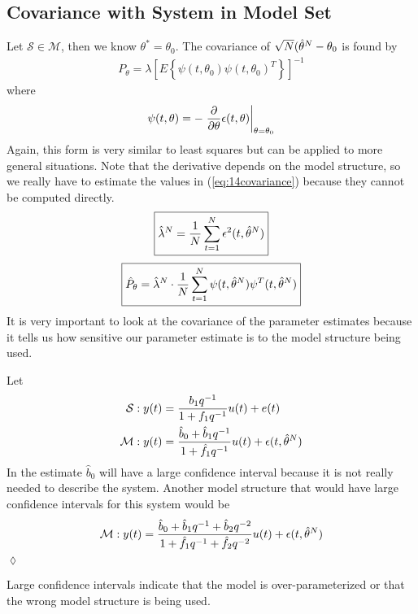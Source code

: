 \subsection{Covariance with System in Model Set}
Let $\mathcal{S}\in\mathcal{M}$, then we know $\theta^\ast=\theta_0$. The covariance of $\sqrt{N}(\hat{\theta}^N-\theta_0$ is found by
\begin{align}
\label{eq:14covariance}
\boxed{P_\theta = \lambda\left[E\left\lbrace \psi(t,\theta_0)\psi(t,\theta_0)^T\right\rbrace\right]^{-1}}
\end{align}
where
$$\psi(t,\theta) = -\left.\frac{\partial}{\partial\theta}\epsilon(t,\theta)\right|_{\theta=\theta_0}$$
Again, this form is very similar to least squares but can be applied to more general situations. Note that the derivative depends on the model structure, so we really have to estimate the values in (\ref{eq:14covariance}) because they cannot be computed directly.
\begin{align*}
\boxed{\hat{\lambda}^N = \frac{1}{N}\sum_{t=1}^N\epsilon^2(t,\hat{\theta}^N)}
\end{align*}
\begin{align*}
\boxed{\hat{P}_\theta = \hat{\lambda}^N\cdot\frac{1}{N}\sum_{t=1}^N\psi(t,\hat{\theta}^N)\psi^T(t,\hat{\theta}^N)}
\end{align*}
It is very important to look at the covariance of the parameter estimates because it tells us how sensitive our parameter estimate is to the model structure being used.

\begin{example}
Let
\begin{align*}
\mathcal{S}: y(t) &= \frac{b_1q^{-1}}{1+f_1q^{-1}}u(t) + e(t) \\
\mathcal{M}: y(t) &= \frac{\hat{b}_0 + \hat{b}_1q^{-1}}{1+\hat{f}_1q^{-1}}u(t) + \epsilon(t,\hat{\theta}^N)
\end{align*}
In the estimate $\hat{b}_0$ will have a large confidence interval because it is not really needed to describe the system. Another model structure that would have large confidence intervals for this system would be
$$\mathcal{M}: y(t) = \frac{\hat{b}_0+\hat{b}_1q^{-1}+\hat{b}_2q^{-2}}{1+\hat{f}_1q^{-1}+\hat{f}_2q^{-2}}u(t)+\epsilon(t,\hat{\theta}^N)$$
$\lozenge$
\end{example}

Large confidence intervals indicate that the model is over-parameterized or that the wrong model structure is being used.

